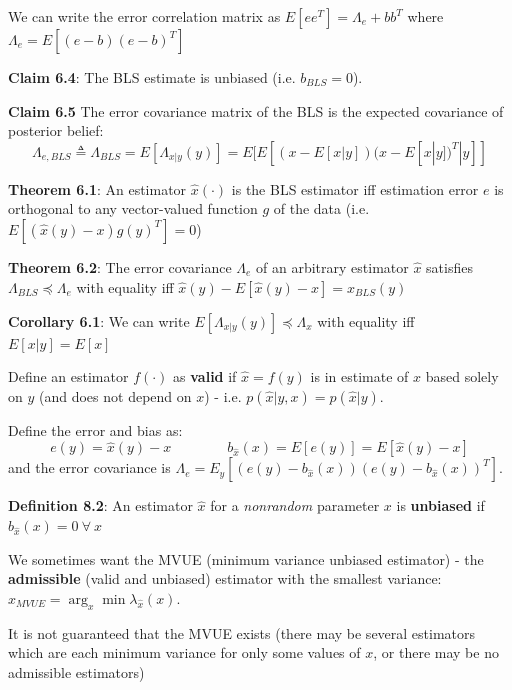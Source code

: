 \documentclass[12pt]{article} %
\begin{document}
We can write the error correlation matrix as $E[ee^T] = \Lambda_e + bb^T$ where $\Lambda_e = E[(e-b)(e-b)^T]$

\textbf{Claim 6.4}: The BLS estimate is unbiased (i.e. $b_{BLS} = 0$).

\textbf{Claim 6.5} The error covariance matrix of the BLS is the expected covariance of posterior belief:
\begin{equation*}
    \Lambda_{e,BLS} \triangleq \Lambda_{BLS} = E[\Lambda_{x|y}(y)] = E[E[(x-E[x|y])(x-E[x|y])^T|y]]
\end{equation*}

\textbf{Theorem 6.1}: An estimator $\hat{x}(\cdot)$ is the BLS estimator iff estimation error $e$ is orthogonal to any vector-valued function $g$ of the data (i.e. $E[(\hat{x}(y) - x) g(y)^T] = 0$)

\textbf{Theorem 6.2}: The error covariance $\Lambda_{e}$ of an arbitrary estimator $\hat{x}$ satisfies $\Lambda_{BLS} \preceq \Lambda_e$ with equality iff $\hat{x}(y) - E[\hat{x}(y)-x] = \hat{x}_{BLS}(y)$

\textbf{Corollary 6.1}: We can write $E[\Lambda_{x|y}(y)] \preceq \Lambda_x$ with equality iff $E[x|y] = E[x]$






\newpage


Define an estimator $f(\cdot)$ as \textbf{valid} if $\hat{x}= f(y)$ is in estimate of $x$ based solely on $y$ (and does not depend on $x$) - i.e. $p(\hat{x}|y,x) = p(\hat{x}|y)$.

Define the error and bias as:
\begin{equation*}
    e(y) = \hat{x}(y) - x \qquad \qquad b_{\hat{x}}(x) = E[e(y)] = E[\hat{x}(y) - x]
\end{equation*}
and the error covariance is $\Lambda_e = E_y[(e(y) - b_{\hat{x}}(x))(e(y) - b_{\hat{x}}(x))^T]$.


\textbf{Definition 8.2}: An estimator $\hat{x}$ for a \textit{nonrandom} parameter $x$ is \textbf{unbiased} if $b_{\hat{x}}(x) = 0 \ \forall \ x$ 

We sometimes want the MVUE (minimum variance unbiased estimator) - the \textbf{admissible} (valid and unbiased) estimator with the smallest variance: $\hat{x}_{MVUE} = \arg_x \min \lambda_{\hat{x}}(x)$.

It is not guaranteed that the MVUE exists (there may be several estimators which are each minimum variance for only some values of $x$, or there may be no admissible estimators)
\end{document}
